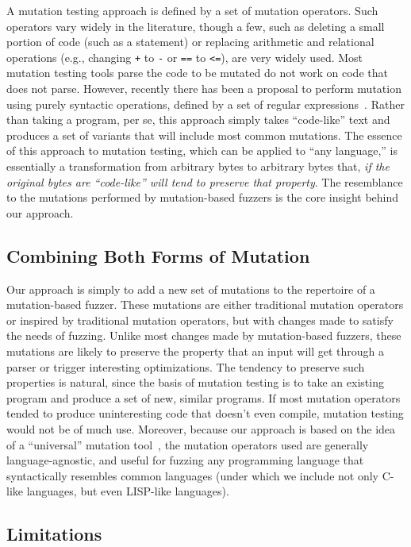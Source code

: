 A mutation testing approach is defined by a set of mutation operators.  Such operators vary widely in the literature, though a few, such as deleting a small portion of code (such as a statement) or replacing arithmetic and relational operations (e.g., changing {\tt +} to {\tt -} or {\tt ==} to {\tt <=}), are very widely used.  Most mutation testing tools parse the code to be mutated do not work on code that does not parse.  However, recently there has been a proposal to perform mutation using purely syntactic operations, defined by a set of regular expressions~\cite{regexpMut}.  Rather than taking a program, per se, this approach simply takes ``code-like'' text and produces a set of variants that will include most common mutations.  The essence of this approach to mutation testing, which can be applied to ``any language,'' is essentially a transformation from arbitrary bytes to arbitrary bytes that, \emph{if the original bytes are ``code-like'' will tend to preserve that property}.  The resemblance to the mutations performed by mutation-based fuzzers is the core insight behind our approach.

\subsection{Combining Both Forms of Mutation}

Our approach is simply to add a new set of mutations to the repertoire of a mutation-based fuzzer.  These mutations are either traditional mutation operators or inspired by traditional mutation operators, but with changes made to satisfy the needs of fuzzing.  Unlike most changes made by mutation-based fuzzers, these mutations are likely to preserve the property that an input will get through a parser or trigger interesting optimizations.  The tendency to preserve such properties is natural, since the basis of mutation testing is to take an existing program and produce a set of new, similar programs.  If most mutation operators tended to produce uninteresting code that doesn't even compile, mutation testing would not be of much use.  Moreover, because our approach is based on the idea of a ``universal'' mutation tool~\cite{regexpMut}, the mutation operators used are generally language-agnostic, and useful for fuzzing any programming language that syntactically resembles common languages (under which we include not only C-like languages, but even LISP-like languages).

\subsection{Limitations}

